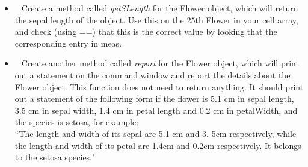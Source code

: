 \documentclass{article}
\begin{document}
\begin{enumerate}[leftmargin=0cm,itemindent=.5cm,labelwidth=\itemindent,labelsep=0cm,align=left,label=\textbf{\arabic*.}]
\begin{itemize}
		\item $\:\:$ Create a method called \textit{getSLength} for the Flower object, which will return the sepal length of the object. Use this on the 25th Flower in your cell array, and check (using ==) that this is the correct value by looking that the corresponding entry in meas.
		\item $\:\:$ Create another method called \textit{report} for the Flower object, which will print out a statement on the command window and report the details about the Flower object. This function does not need to return anything. It should print out a statement of the following form if the flower is 5.1 cm in sepal length, 3.5 cm in sepal width, 1.4 cm in petal length and 0.2 cm in petalWidth, and the species is setosa, for example: \\
``The length and width of its sepal are 5.1 cm and 3. 5cm respectively, while the length and width of its petal are 1.4cm and 0.2cm respectively. It belongs to the setosa species."
	\end{itemize}

\end{enumerate}
\end{document}
